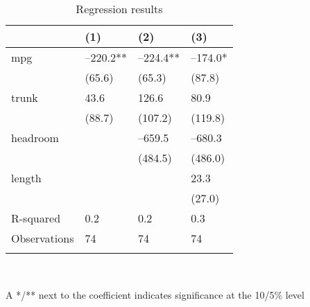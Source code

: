 \documentclass{article}
\begin{document}
\begin{table}[tbp] \centering
{}

\caption{Regression results}
\begin{tabularx}{\linewidth}{@{}lCCC@{}}

\toprule
&{(1)}&{(2)}&{(3)} \tabularnewline
\midrule \addlinespace[\belowrulesep]
mpg&--220.2**&--224.4**&--174.0* \tabularnewline
&(65.6)&(65.3)&(87.8) \tabularnewline
trunk&43.6&126.6&80.9 \tabularnewline
&(88.7)&(107.2)&(119.8) \tabularnewline
headroom&&--659.5&--680.3 \tabularnewline
&&(484.5)&(486.0) \tabularnewline
length&&&23.3 \tabularnewline
&&&(27.0) \tabularnewline
\midrule R-squared&0.2&0.2&0.3 \tabularnewline
Observations&74&74&74 \tabularnewline
\bottomrule \addlinespace[\belowrulesep]

\end{tabularx}
\\ \parbox{\linewidth}{\footnotesize A */** next to the coefficient indicates significance at the 10/5\% level}
\end{table}
\end{document}
